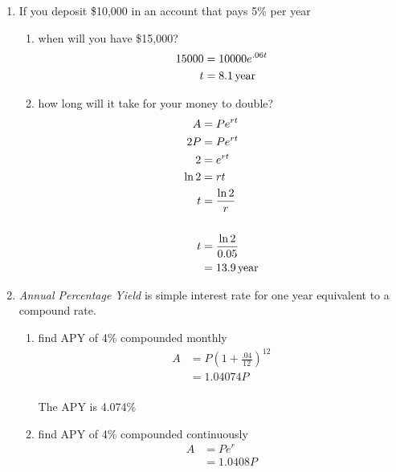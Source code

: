 \documentclass{exam}
\begin{document}
  \begin{enumerate}
    \item If you deposit \$10,000 in an account that pays 5\% per year
      
      \begin{enumerate}[a]
        \item when will you have \$15,000?
          \begin{align*}
            15000 &= 10000 e^{.06t} \\
            t     &= \unit[8.1]{year} \\
          \end{align*}

        \item how long will it take for your money to double?
          \begin{align*}
            A     &= P e^{rt} \\
            2P    &= P e^{rt} \\
            2     &= e^{rt} \\
            \ln 2 &= rt \\
            t     &= \frac{\ln 2}{r} \\
            \\
            t     &= \frac{\ln 2}{0.05} \\
                  &= \unit[13.9]{year} \\
          \end{align*}

      \end{enumerate}

    \item {\em Annual Percentage Yield} is simple interest rate for one year equivalent to a compound rate.
      \begin{enumerate}[a]
        \item find APY of 4\% compounded monthly
          \begin{align*}
            A &= P \left( 1 + \frac{.04}{12} \right)^{12} \\
              &= 1.04074 P \\
          \end{align*}

          The APY is 4.074\%

        \item find APY of 4\% compounded continuously
          \begin{align*}
            A &= P e^r \\
              &= 1.0408 P \\
          \end{align*}


\end{enumerate}
\end{enumerate}
\end{document}
